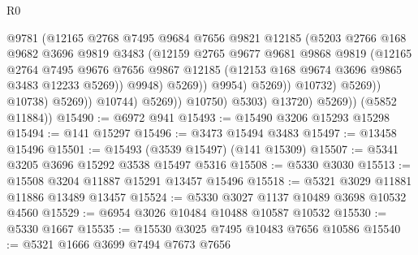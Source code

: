 \begin{lexlean}{R0}
\begin{coremodule}
                                        @9781
                                        (@12165
                                          @2768
                                          @7495
                                          @9684
                                          @7656
                                          @9821
                                          @12185
                                          (@5203
                                            @2766
                                            @168
                                            @9682
                                            @3696
                                            @9819
                                            @3483
                                            (@12159
                                              @2765
                                              @9677
                                              @9681
                                              @9868
                                              @9819
                                              (@12165
                                                @2764
                                                @7495
                                                @9676
                                                @7656
                                                @9867
                                                @12185
                                                (@12153 @168 @9674 @3696 @9865 @3483 @12233 @5269))
                                              @9948)
                                            @5269))
                                        @9954)
                                      @5269))
                                  @10732)
                                @5269))
                            @10738)
                          @5269))
                      @10744)
                    @5269))
                @10750)
              @5303)
            @13720)
          @5269))
      (@5852 @11884))
@15490 := @6972 @941
@15493 := @15490 @3206 @15293 @15298
@15494 := @141 @15297
@15496 := @3473 @15494 @3483
@15497 := @13458 @15496
@15501 := @15493 (@3539 @15497) (@141 @15309)
@15507 := @5341 @3205 @3696 @15292 @3538 @15497 @5316
@15508 := @5330 @3030
@15513 := @15508 @3204 @11887 @15291 @13457 @15496
@15518 := @5321 @3029 @11881 @11886 @13489 @13457
@15524 := @5330 @3027 @1137 @10489 @3698 @10532 @4560
@15529 := @6954 @3026 @10484 @10488 @10587 @10532
@15530 := @5330 @1667
@15535 := @15530 @3025 @7495 @10483 @7656 @10586
@15540 := @5321 @1666 @3699 @7494 @7673 @7656

\end{coremodule}
\end{lexlean}
